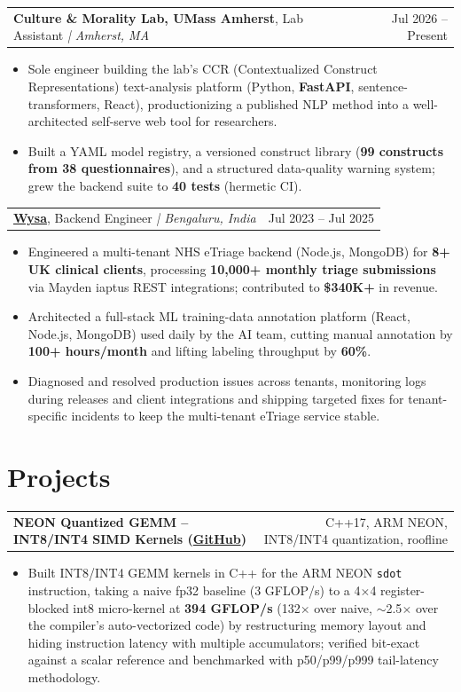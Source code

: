\documentclass[letterpaper,11pt]{article}
\makeatletter
\newcommand{\expItem}[4]{%
  \vspace{2pt}
  \begin{tabular*}{\textwidth}{@{}l@{\extracolsep{\fill}}r@{}}
    \textbf{#1}, #2 \textit{| #3} & #4 \\
  \end{tabular*}\par\vspace{-3pt}
}
\newcommand{\projItem}[2]{%
  \vspace{2pt}
  \begin{tabular*}{\textwidth}{@{}l@{\extracolsep{\fill}}r@{}}
    \textbf{#1} & #2 \\
  \end{tabular*}\par\vspace{-3pt}
}
\makeatother
\begin{document}
\expItem{Culture \& Morality Lab, UMass Amherst}{Lab Assistant}{Amherst, MA}{Jul 2026 -- Present}
\begin{itemize}
  \item Sole engineer building the lab's CCR (Contextualized Construct Representations) text-analysis platform (Python, \textbf{FastAPI}, sentence-transformers, React), productionizing a published NLP method into a well-architected self-serve web tool for researchers.
  \item Built a YAML model registry, a versioned construct library (\textbf{99 constructs from 38 questionnaires}), and a structured data-quality warning system; grew the backend suite to \textbf{40 tests} (hermetic CI).
\end{itemize}

\expItem{\href{https://www.wysa.io}{Wysa}}{Backend Engineer}{Bengaluru, India}{Jul 2023 -- Jul 2025}
\begin{itemize}
  \item Engineered a multi-tenant NHS eTriage backend (Node.js, MongoDB) for \textbf{8+ UK clinical clients}, processing \textbf{10{,}000+ monthly triage submissions} via Mayden iaptus REST integrations; contributed to \textbf{\$340K+} in revenue.
  \item Architected a full-stack ML training-data annotation platform (React, Node.js, MongoDB) used daily by the AI team, cutting manual annotation by \textbf{100+ hours/month} and lifting labeling throughput by \textbf{60\%}.
  \item Diagnosed and resolved production issues across tenants, monitoring logs during releases and client integrations and shipping targeted fixes for tenant-specific incidents to keep the multi-tenant eTriage service stable.
\end{itemize}

\section{Projects}

\projItem{NEON Quantized GEMM -- INT8/INT4 SIMD Kernels {\normalfont\small(\href{https://github.com/Deva-1903/neon-quantized-gemm}{GitHub})}}{C++17, ARM NEON, INT8/INT4 quantization, roofline}
\begin{itemize}
  \item Built INT8/INT4 GEMM kernels in C++ for the ARM NEON \texttt{sdot} instruction, taking a naive fp32 baseline (3 GFLOP/s) to a 4$\times$4 register-blocked int8 micro-kernel at \textbf{394 GFLOP/s} (132$\times$ over naive, $\sim$2.5$\times$ over the compiler's auto-vectorized code) by restructuring memory layout and hiding instruction latency with multiple accumulators; verified bit-exact against a scalar reference and benchmarked with p50/p99/p999 tail-latency methodology.
\end{itemize}
\end{document}
